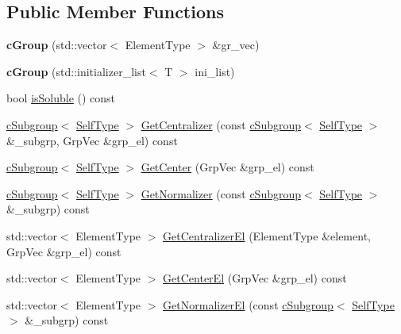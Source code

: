 \subsection*{\-Public \-Member \-Functions}
\begin{DoxyCompactItemize}
\item 
\hypertarget{classcGroup_a28f87c232c9d07ba9f9b0ec159e8243a}{{\bfseries c\-Group} (std\-::vector$<$ \-Element\-Type $>$ \&gr\-\_\-vec)}\label{classcGroup_a28f87c232c9d07ba9f9b0ec159e8243a}

\item 
\hypertarget{classcGroup_a38b515a0db10fa1fcebe7b635fc0d481}{{\bfseries c\-Group} (std\-::initializer\-\_\-list$<$ \-T $>$ ini\-\_\-list)}\label{classcGroup_a38b515a0db10fa1fcebe7b635fc0d481}

\item 
bool \hyperlink{classcGroup_acb69bf5f56805920d414a80ac5e54f36}{is\-Soluble} () const 
\item 
\hyperlink{classcSubgroup}{c\-Subgroup}$<$ \hyperlink{classcGroup}{\-Self\-Type} $>$ \hyperlink{classcGroup_a5177b0cd3b5a1c6d1dc7673c28fa14f0}{\-Get\-Centralizer} (const \hyperlink{classcSubgroup}{c\-Subgroup}$<$ \hyperlink{classcGroup}{\-Self\-Type} $>$ \&\-\_\-subgrp, \-Grp\-Vec \&grp\-\_\-el) const 
\item 
\hyperlink{classcSubgroup}{c\-Subgroup}$<$ \hyperlink{classcGroup}{\-Self\-Type} $>$ \hyperlink{classcGroup_ade523d25a78970fffa70f17d68643d15}{\-Get\-Center} (\-Grp\-Vec \&grp\-\_\-el) const 
\item 
\hyperlink{classcSubgroup}{c\-Subgroup}$<$ \hyperlink{classcGroup}{\-Self\-Type} $>$ \hyperlink{classcGroup_a1bcc2cdb6db5251b23cd099b25ffa057}{\-Get\-Normalizer} (const \hyperlink{classcSubgroup}{c\-Subgroup}$<$ \hyperlink{classcGroup}{\-Self\-Type} $>$ \&\-\_\-subgrp) const 
\item 
std\-::vector$<$ \-Element\-Type $>$ \hyperlink{classcGroup_ac0b8279834b59139afeb562be03937de}{\-Get\-Centralizer\-El} (\-Element\-Type \&element, \-Grp\-Vec \&grp\-\_\-el) const 
\item 
std\-::vector$<$ \-Element\-Type $>$ \hyperlink{classcGroup_aa0946d645c3ae06c56dc16f13a9f7ef2}{\-Get\-Center\-El} (\-Grp\-Vec \&grp\-\_\-el) const 
\item 
std\-::vector$<$ \-Element\-Type $>$ \hyperlink{classcGroup_a442a90478046593d38f5d131eb22b9a9}{\-Get\-Normalizer\-El} (const \hyperlink{classcSubgroup}{c\-Subgroup}$<$ \hyperlink{classcGroup}{\-Self\-Type} $>$ \&\-\_\-subgrp) const 
\end{DoxyCompactItemize}


